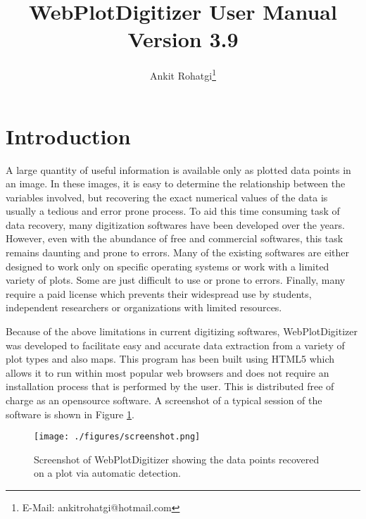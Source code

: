 \documentclass[letterpaper, 10pt]{article}
\begin{document}
\title{WebPlotDigitizer User Manual\\ Version 3.9}
\author{Ankit Rohatgi\footnote{E-Mail: ankitrohatgi@hotmail.com}}
\maketitle
\tableofcontents
\newpage
\section{Introduction}
A large quantity of useful information is available only as plotted data points in an image. In these images, it is easy to determine the relationship between the variables involved, but recovering the exact numerical values of the data is usually a tedious and error prone process. To aid this time consuming task of data recovery, many digitization softwares have been developed over the years. However, even with the abundance of free and commercial softwares, this task remains daunting and prone to errors. Many of the existing softwares are either designed to work only on specific operating systems or work with a limited variety of plots. Some are just difficult to use or prone to errors. Finally, many require a paid license which prevents their widespread use by students, independent researchers or organizations with limited resources.

Because of the above limitations in current digitizing softwares, WebPlotDigitizer was developed to facilitate easy and accurate data extraction from a variety of plot types and also maps. This program has been built using HTML5 which allows it to run within most popular web browsers and does not require an installation process that is performed by the user. This is distributed free of charge as an opensource software. A screenshot of a typical session of the software is shown in Figure \ref{fig:screenshot}.

\begin{figure}
\begin{center}
\texttt{[image: ./figures/screenshot.png]}
\caption{Screenshot of WebPlotDigitizer showing the data points recovered on a plot via automatic detection.}
\label{fig:screenshot}
\end{center}
\end{figure}
\end{document}
